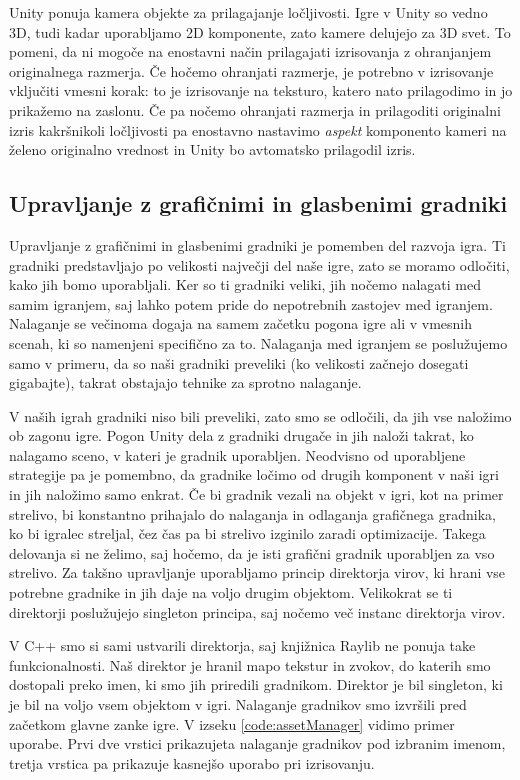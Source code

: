 \documentclass[12pt,a4paper,twoside]{book}
\begin{document}
Unity ponuja kamera objekte za prilagajanje ločljivosti. Igre v Unity so vedno 3D, tudi kadar uporabljamo 2D komponente, zato kamere delujejo za 3D svet. To pomeni, da ni mogoče na enostavni način prilagajati izrisovanja z ohranjanjem originalnega razmerja. Če hočemo ohranjati razmerje, je potrebno v izrisovanje vključiti vmesni korak: to je izrisovanje na teksturo, katero nato prilagodimo in jo prikažemo na zaslonu. Če pa nočemo ohranjati razmerja in prilagoditi originalni izris kakršnikoli ločljivosti pa enostavno nastavimo \textit{aspekt} komponento kameri na želeno originalno vrednost in Unity bo avtomatsko prilagodil izris.

\subsection{Upravljanje z grafičnimi in glasbenimi gradniki}
\label{section:upravljanje}
Upravljanje z grafičnimi in glasbenimi gradniki je pomemben del razvoja igra. Ti gradniki predstavljajo po velikosti največji del naše igre, zato se moramo odločiti, kako jih bomo uporabljali. Ker so ti gradniki veliki, jih nočemo nalagati med samim igranjem, saj lahko potem pride do nepotrebnih zastojev med igranjem. Nalaganje se večinoma dogaja na samem začetku pogona igre ali v vmesnih scenah, ki so namenjeni specifično za to. Nalaganja med igranjem se poslužujemo samo v primeru, da so naši gradniki preveliki (ko velikosti začnejo dosegati gigabajte), takrat obstajajo tehnike za sprotno nalaganje.

V naših igrah gradniki niso bili preveliki, zato smo se odločili, da jih vse naložimo ob zagonu igre. Pogon Unity dela z gradniki drugače in jih naloži takrat, ko nalagamo sceno, v kateri je gradnik uporabljen. Neodvisno od uporabljene strategije pa je pomembno, da gradnike ločimo od drugih komponent v naši igri in jih naložimo samo enkrat. Če bi gradnik vezali na objekt v igri, kot na primer strelivo, bi konstantno prihajalo do nalaganja in odlaganja grafičnega gradnika, ko bi igralec streljal, čez čas pa bi strelivo izginilo zaradi optimizacije. Takega delovanja si ne želimo, saj hočemo, da je isti grafični gradnik uporabljen za vso strelivo. Za takšno upravljanje uporabljamo princip direktorja virov, ki hrani vse potrebne gradnike in jih daje na voljo drugim objektom. Velikokrat se ti direktorji poslužujejo singleton principa, saj nočemo več instanc direktorja virov.

V C++ smo si sami ustvarili direktorja, saj knjižnica Raylib ne ponuja take funkcionalnosti. Naš direktor je hranil mapo tekstur in zvokov, do katerih smo dostopali preko imen, ki smo jih priredili gradnikom. Direktor je bil singleton, ki je bil na voljo vsem objektom v igri. Nalaganje gradnikov smo izvršili pred začetkom glavne zanke igre. V izseku \ref{code:assetManager} vidimo primer uporabe. Prvi dve vrstici prikazujeta nalaganje gradnikov pod izbranim imenom, tretja vrstica pa prikazuje kasnejšo uporabo pri izrisovanju. 
\end{document}
